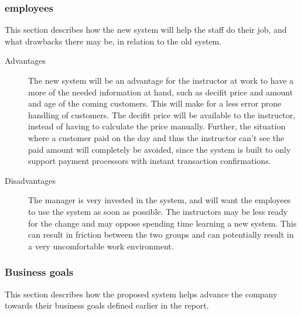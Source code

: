 \subsubsection{\gomonkey{} employees}
This section describes how the new system will help the staff do their 
job, and what drawbacks there may be, in relation to the old system.

\begin{description}
\item[Advantages]
The new system will be an
advantage for the instructor at work to have a more of the needed information
at hand, such as decifit price and amount and age of the coming customers. 
This will make for a less error prone handling of customers. The 
decifit price will be available to the instructor, instead of having to 
calculate the price manually. Further, the situation where a customer paid on 
the day and thus the instructor can't see the paid amount will completely be 
avoided, since the system is built to only support payment processors with 
instant transaction confirmations.

\item[Disadvantages]
The manager is very invested in the system, and will want the employees to 
use the system as soon as possible. The instructors may be less ready for the change and may
oppose spending time learning a new system. This can result in friction between
the two groups and can potentially result in a very uncomfortable work 
environment. 
\end{description}

\subsubsection{Business goals}
This section describes how the proposed system helps advance the company towards their 
business goals defined earlier in the report. 

